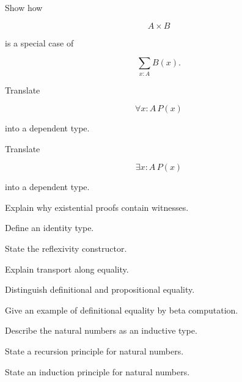 \begin{exercise}[3]
Show how

\[
A\times B
\]

is a special case of

\[
\sum_{x:A}B(x).
\]
\end{exercise}

\begin{exercise}[3]
Translate

\[
\forall x:A\,P(x)
\]

into a dependent type.
\end{exercise}

\begin{exercise}[3]
Translate

\[
\exists x:A\,P(x)
\]

into a dependent type.
\end{exercise}

\begin{exercise}[3]
Explain why existential proofs contain witnesses.
\end{exercise}

\begin{exercise}[2]
Define an identity type.
\end{exercise}

\begin{exercise}[2]
State the reflexivity constructor.
\end{exercise}

\begin{exercise}[3]
Explain transport along equality.
\end{exercise}

\begin{exercise}[3]
Distinguish definitional and propositional equality.
\end{exercise}

\begin{exercise}[3]
Give an example of definitional equality by beta computation.
\end{exercise}

\begin{exercise}[2]
Describe the natural numbers as an inductive type.
\end{exercise}

\begin{exercise}[3]
State a recursion principle for natural numbers.
\end{exercise}

\begin{exercise}[3]
State an induction principle for natural numbers.
\end{exercise}

